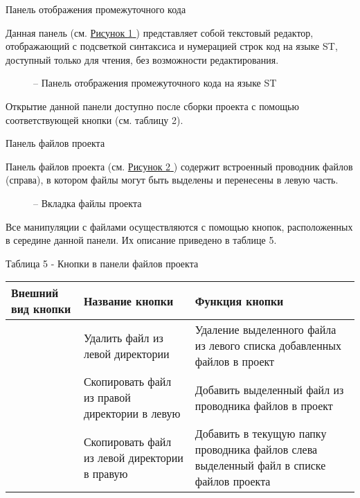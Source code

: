 \documentclass[letterpaper,10pt,russian]{sphinxmanual}
\begin{document}
Панель отображения промежуточного кода

Данная панель (см. \hyperref[usage_guide/ide_components:image48]{Рисунок \ref{usage_guide/ide_components:image48} }) представляет собой текстовый редактор,
отображающий с подсветкой синтаксиса и нумерацией строк код на языке ST,
доступный только для чтения, без возможности редактирования.
\begin{figure}[htbp]
\centering
\capstart

\noindent{}
\caption{– Панель отображения промежуточного кода на языке ST}\label{usage_guide/ide_components:image48}\end{figure}

Открытие данной панели доступно после сборки проекта с помощью
соответствующей кнопки (см. таблицу 2).

Панель файлов проекта

Панель файлов проекта (см. \hyperref[usage_guide/ide_components:image49]{Рисунок \ref{usage_guide/ide_components:image49} }) содержит встроенный проводник файлов
(справа), в котором файлы могут быть выделены и перенесены в левую
часть.
\begin{figure}[htbp]
\centering
\capstart

\noindent{}
\caption{– Вкладка файлы проекта}\label{usage_guide/ide_components:image49}\end{figure}

Все манипуляции с файлами осуществляются с помощью кнопок, расположенных
в середине данной панели. Их описание приведено в таблице 5.

Таблица 5 - Кнопки в панели файлов проекта

\noindent\begin{tabulary}{\linewidth}{|L|L|L|}
\hline
\textsf{\relax 
Внешний вид кнопки
\unskip}\relax &\textsf{\relax 
Название кнопки
\unskip}\relax &\textsf{\relax 
Функция кнопки
\unskip}\relax \\
\hline
{}
&
Удалить файл из левой
директории
&
Удаление выделенного
файла из левого
списка добавленных
файлов в проект
\\
\hline
{}
&
Скопировать файл из
правой директории в
левую
&
Добавить выделенный
файл из проводника
файлов в проект
\\
\hline
{}
&
Скопировать файл из
левой директории в
правую
&
Добавить в текущую
папку проводника
файлов слева
выделенный файл в
списке файлов проекта
\\
\hline\end{tabulary}
\end{document}
